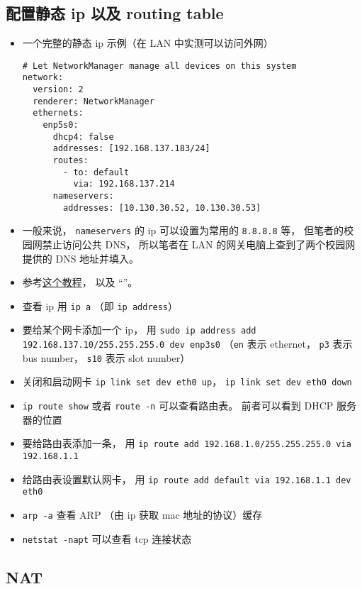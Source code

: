 \subsection{配置静态 ip 以及 routing table}
\begin{itemize}
\item 一个完整的静态 ip 示例（在 LAN 中实测可以访问外网）
\begin{lstlisting}[language=none, caption=01-network-manager-all.yaml]
# Let NetworkManager manage all devices on this system
network:
  version: 2
  renderer: NetworkManager
  ethernets:
    enp5s0:
      dhcp4: false
      addresses: [192.168.137.183/24]
      routes:
        - to: default
          via: 192.168.137.214
      nameservers:
        addresses: [10.130.30.52, 10.130.30.53]
\end{lstlisting}
\item 一般来说， \verb`nameservers` 的 ip 可以设置为常用的 \verb`8.8.8.8` 等， 但笔者的校园网禁止访问公共 DNS， 所以笔者在 LAN 的网关电脑上查到了两个校园网提供的 DNS 地址并填入。
\item 参考\href{https://linuxiac.com/how-to-set-static-ip-address-and-modifying-routing-table-on-linux/}{这个教程}， 以及 “”。
\item 查看 ip 用 \verb`ip a` （即 \verb`ip address`）
\item 要给某个网卡添加一个 ip， 用 \verb`sudo ip address add 192.168.137.10/255.255.255.0 dev enp3s0` （\verb`en` 表示 ethernet， \verb`p3` 表示 bus number， \verb`s10` 表示 slot number）
\item 关闭和启动网卡 \verb`ip link set dev eth0 up`， \verb`ip link set dev eth0 down`
\item \verb`ip route show` 或者 \verb`route -n` 可以查看路由表。 前者可以看到 DHCP 服务器的位置
\item 要给路由表添加一条， 用 \verb`ip route add 192.168.1.0/255.255.255.0 via 192.168.1.1`
\item 给路由表设置默认网卡， 用 \verb`ip route add default via 192.168.1.1 dev eth0`
\item \verb`arp -a` 查看 ARP （由 ip 获取 mac 地址的协议）缓存
\item \verb`netstat -napt` 可以查看 tcp 连接状态
\end{itemize}


\subsection{NAT}
